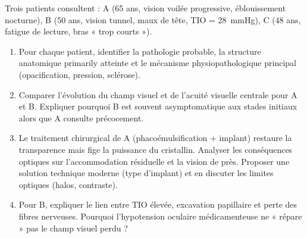 \documentclass[11pt]{article}
\begin{document}
\begin{exercice}
Trois patients consultent : A (65 ans, vision voilée progressive, éblouissement nocturne), B (50 ans, vision tunnel, maux de tête, TIO = \SI{28}{\mmHg}), C (48 ans, fatigue de lecture, bras « trop courts »).
\begin{enumerate}
    \item Pour chaque patient, identifier la pathologie probable, la structure anatomique primarily atteinte et le mécanisme physiopathologique principal (opacification, pression, sclérose).
    \item Comparer l'évolution du champ visuel et de l'acuité visuelle centrale pour A et B. Expliquer pourquoi B est souvent asymptomatique aux stades initiaux alors que A consulte précocement.
    \item Le traitement chirurgical de A (phacoémulsification + implant) restaure la transparence mais fige la puissance du cristallin. Analyser les conséquences optiques sur l'accommodation résiduelle et la vision de près. Proposer une solution technique moderne (type d'implant) et en discuter les limites optiques (halos, contraste).
    \item Pour B, expliquer le lien entre TIO élevée, excavation papillaire et perte des fibres nerveuses. Pourquoi l'hypotension oculaire médicamenteuse ne « répare » pas le champ visuel perdu ?
\end{enumerate}
\end{exercice}
\end{document}
